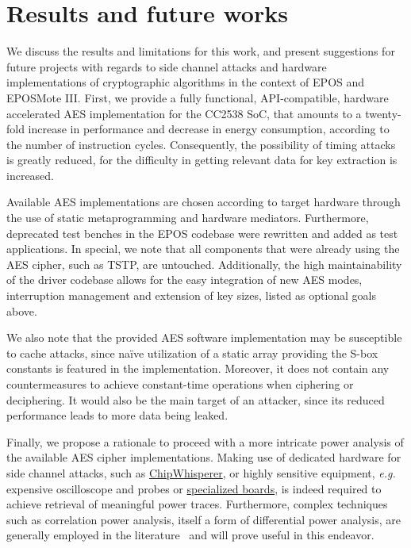 \documentclass{../sftex/sftex}
\begin{document}
\section{Results and future works}

We discuss the results and limitations for this work, and present suggestions
for future projects with regards to side channel attacks and hardware
implementations of cryptographic algorithms in the context of EPOS and EPOSMote
III\@. First, we provide a fully functional, API-compatible, hardware
accelerated AES implementation for the CC2538 SoC, that amounts to a
twenty-fold increase in performance and decrease in energy consumption,
according to the number of instruction cycles. Consequently, the possibility of
timing attacks is greatly reduced, for the difficulty in getting relevant data
for key extraction is increased.

Available AES implementations are chosen according to target hardware through
the use of static metaprogramming and hardware mediators. Furthermore,
deprecated test benches in the EPOS codebase were rewritten and added as
test applications. In special, we note that all components that were already
using the AES cipher, such as TSTP, are untouched. Additionally, the high
maintainability of the driver codebase allows for the easy integration of
new AES modes, interruption management and extension of key sizes, listed as
optional goals above.

We also note that the provided AES software implementation may be susceptible
to cache attacks, since naïve utilization of a static array providing the S-box
constants is featured in the implementation. Moreover, it does not contain any
countermeasures to achieve constant-time operations when ciphering or
deciphering. It would also be the main target of an attacker, since its reduced
performance leads to more data being leaked.

Finally, we propose a rationale to proceed with a more intricate power analysis
of the available AES cipher implementations. Making use of dedicated hardware
for side channel attacks, such as
\href{https://github.com/newaetech/chipwhisperer}{ChipWhisperer}, or highly
sensitive equipment, \emph{e.g.} expensive oscilloscope and probes or
\href{https://web.archive.org/web/20170621162219/satoh.cs.uec.ac.jp/SASEBO/en}{
specialized boards}, is indeed required to achieve retrieval of meaningful
power traces. Furthermore, complex techniques such as correlation power
analysis, itself a form of differential power analysis, are generally employed
in the literature~\cite{Biryukov:inproc:2017:jul} and will prove useful in this
endeavor.



\end{document}
